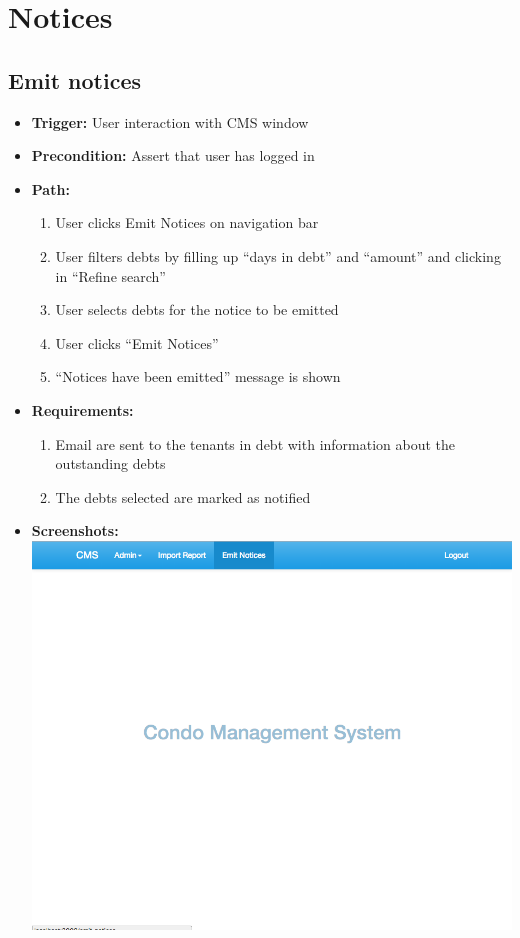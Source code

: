 \section*{Notices}

\subsection*{Emit notices}

\begin{itemize}
  \item[] \textbf{Trigger:} User interaction with CMS window
  \item[] \textbf{Precondition:} Assert that user has logged in
  \item[] \textbf{Path:}
    \begin{enumerate}
      \item User clicks Emit Notices on navigation bar
      \item User filters debts by filling up ``days in debt'' and ``amount'' and clicking in ``Refine search''
      \item User selects debts for the notice to be emitted
      \item User clicks ``Emit Notices''
      \item ``Notices have been emitted'' message is shown
    \end{enumerate}
  \item[] \textbf{Requirements:}
    \begin{enumerate}
      \item Email are sent to the tenants in debt with information about the outstanding debts
      \item The debts selected are marked as notified
    \end{enumerate}
  \item[] \textbf{Screenshots:} \\
    \includegraphics[scale=0.25]{./images/ss/notice/1.png}

\end{itemize}
